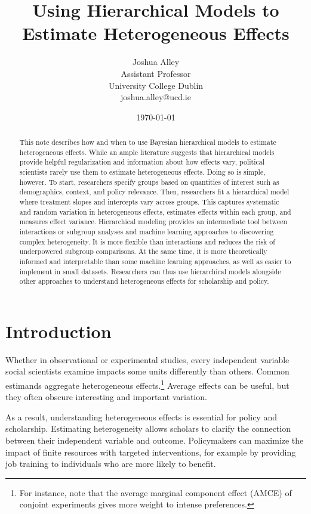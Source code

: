 \documentclass[12pt]{article}
\title{\textbf{Using Hierarchical Models to Estimate Heterogeneous Effects}}
\author{Joshua Alley \\
Assistant Professor \\
University College Dublin \\
joshua.alley@ucd.ie
}
\date{\today}
\begin{document}
\maketitle 

\begin{abstract} 
This note describes how and when to use Bayesian hierarchical models to estimate heterogeneous effects. 
While an ample literature suggests that hierarchical models provide helpful regularization and information about how effects vary, political scientists rarely use them to estimate heterogeneous effects. 
Doing so is simple, however. 
To start, researchers specify groups based on quantities of interest such as demographics, context, and policy relevance.  
Then, researchers fit a hierarchical model where treatment slopes and intercepts vary across groups.
This captures systematic and random variation in heterogeneous effects, estimates effects within each group, and measures effect variance. 
Hierarchical modeling provides an intermediate tool between interactions or subgroup analyses and machine learning approaches to discovering complex heterogeneity. 
It is more flexible than interactions and reduces the risk of underpowered subgroup comparisons.
At the same time, it is more theoretically informed and interpretable than some machine learning approaches, as well as easier to implement in small datasets. 
Researchers can thus use hierarchical models alongside other approaches to understand heterogeneous effects for scholarship and policy.
\end{abstract} 


\newpage 
\doublespace 


\section{Introduction}


Whether in observational or experimental studies, every independent variable social scientists examine impacts some units differently than others. 
Common estimands aggregate heterogeneous effects.\footnote{For instance, \citet{Abramsonetal2022} note that the average marginal component effect (AMCE) of conjoint experiments gives more weight to intense preferences.} 
Average effects can be useful, but they often obscure interesting and important variation. 


As a result, understanding heterogeneous effects is essential for policy and scholarship. 
Estimating heterogeneity allows scholars to clarify the connection between their independent variable and outcome.
Policymakers can maximize the impact of finite resources with targeted interventions, for example by providing job training to individuals who are more likely to benefit. 
\end{document}
